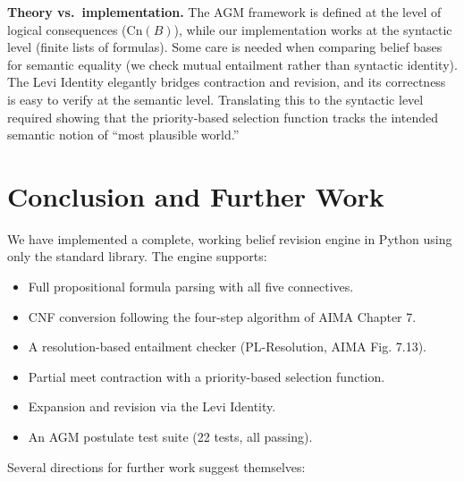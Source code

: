 \documentclass[11pt,a4paper]{article}
\newcommand{\Cn}{\mathrm{Cn}}
\begin{document}
\textbf{Theory vs.\ implementation.}
The AGM framework is defined at the level of logical consequences ($\Cn(B)$),
while our implementation works at the syntactic level (finite lists of
formulas).  Some care is needed when comparing belief bases for semantic
equality (we check mutual entailment rather than syntactic identity).
The Levi Identity elegantly bridges contraction and revision, and its
correctness is easy to verify at the semantic level.  Translating this to
the syntactic level required showing that the priority-based selection
function tracks the intended semantic notion of ``most plausible world.''

\section{Conclusion and Further Work}

We have implemented a complete, working belief revision engine in Python using
only the standard library.  The engine supports:

\begin{itemize}[noitemsep]
  \item Full propositional formula parsing with all five connectives.
  \item CNF conversion following the four-step algorithm of AIMA Chapter 7.
  \item A resolution-based entailment checker (PL-Resolution, AIMA Fig. 7.13).
  \item Partial meet contraction with a priority-based selection function.
  \item Expansion and revision via the Levi Identity.
  \item An AGM postulate test suite (22 tests, all passing).
\end{itemize}

Several directions for further work suggest themselves:
\end{document}
